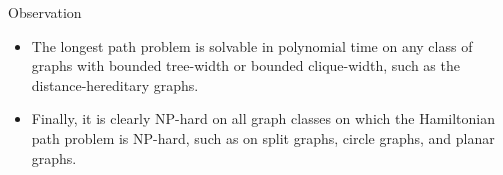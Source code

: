 \begin{frame}{Observation}
    \begin{itemize}
        \item The longest path problem is solvable in polynomial time 
on any class of graphs with bounded tree-width or bounded clique-width, 
such as the distance-hereditary graphs.
        \item Finally, it is clearly NP-hard 
on all graph classes on which the Hamiltonian path problem is NP-hard, 
such as on split graphs, circle graphs, and planar graphs.
    \end{itemize}
    
\end{frame}

    
    

